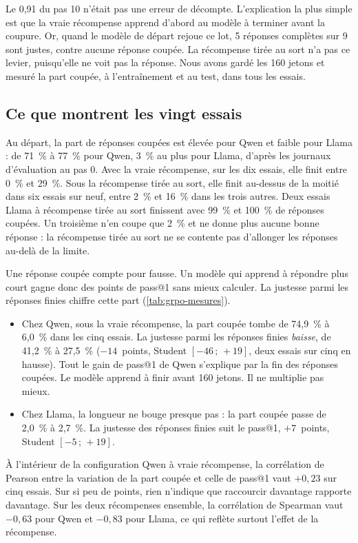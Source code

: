 

Le 0,91 du pas 10 n'était pas une erreur de décompte. L'explication la plus simple est que la vraie
récompense apprend d'abord au modèle à terminer avant la coupure. Or, quand le modèle de départ rejoue ce lot,
5 réponses complètes sur 9 sont justes, contre aucune réponse coupée. La récompense tirée au sort n'a pas ce levier, puisqu'elle ne voit pas la réponse. Nous avons gardé
les 160 jetons et mesuré la part coupée, à l'entraînement et au test, dans tous les essais.

\subsection{Ce que montrent les vingt essais}

Au départ, la part de réponses coupées est élevée pour Qwen et faible pour Llama : de 71~\% à
77~\% pour Qwen, 3~\% au plus pour Llama, d'après les journaux d'évaluation au pas 0. Avec la vraie récompense, sur les dix essais, elle finit entre 0~\% et 29~\%. Sous la
récompense tirée au sort, elle finit au-dessus de la moitié dans six essais sur neuf, entre 2~\% et 16~\% dans
les trois autres. Deux essais Llama à récompense tirée au sort finissent avec 99~\% et 100~\% de
réponses coupées. Un troisième n'en coupe que 2~\% et ne donne plus aucune bonne réponse : la
récompense tirée au sort ne se contente pas d'allonger les réponses au-delà de la limite.

Une réponse coupée compte pour fausse. Un modèle qui apprend à répondre plus court gagne donc des
points de pass@1 sans mieux calculer. La justesse parmi les réponses finies chiffre cette part
(\cref{tab:grpo-mesures}).
\begin{itemize}
  \item Chez Qwen, sous la vraie récompense, la part coupée tombe de 74,9~\% à 6,0~\% dans les cinq essais.
    La justesse parmi les réponses finies \emph{baisse}, de 41,2~\% à 27,5~\% ($-14$~points, Student
    $[-46\,;\,+19]$, deux essais sur cinq en hausse). Tout le gain de pass@1 de Qwen s'explique par la fin des
    réponses coupées. Le modèle apprend à finir avant 160 jetons. Il ne multiplie pas mieux.
  \item Chez Llama, la longueur ne bouge presque pas : la part coupée passe de 2,0~\% à 2,7~\%. La justesse
    des réponses finies suit le pass@1, $+7$~points, Student $[-5\,;\,+19]$.
\end{itemize}
À l'intérieur de la configuration Qwen à vraie récompense, la corrélation de Pearson entre la variation de la
part coupée et celle de pass@1 vaut $+0{,}23$ sur cinq essais. Sur si peu de points, rien n'indique que
raccourcir davantage rapporte davantage. Sur les deux récompenses ensemble, la corrélation de Spearman vaut $-0{,}63$ pour Qwen et $-0{,}83$
pour Llama, ce qui reflète surtout l'effet de la récompense.

